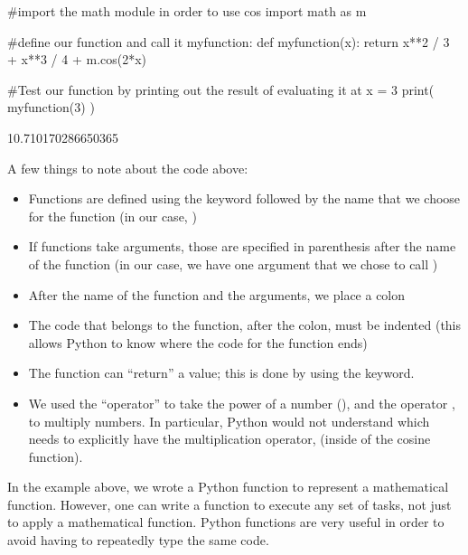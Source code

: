 \begin{python}[caption=Defining a function] 
#import the math module in order to use cos
import math as m

#define our function and call it myfunction:
def myfunction(x):
  return x**2 / 3 + x**3 / 4 + m.cos(2*x)
  
#Test our function by printing out the result of evaluating it at x = 3
print( myfunction(3) )  
\end{python}
\begin{poutput}
10.710170286650365
\end{poutput}
A few things to note about the code above:
\begin{itemize}
\item Functions are defined using the  keyword followed by the name that we choose for the function (in our case, )
\item If functions take arguments, those are specified in parenthesis after the name of the function (in our case, we have one argument that we chose to call )
\item After the name of the function and the arguments, we place a colon
\item The code that belongs to the function, after the colon, must be indented (this allows Python to know where the code for the function ends)
\item The function can ``return'' a value; this is done by using the  keyword. 
\item We used the ``operator'' \code{**} to take the power of a number (), and the operator \code{*}, to multiply numbers. In particular, Python would not understand  which needs to explicitly have the multiplication operator,  (inside of the cosine function).
\end{itemize}
In the example above, we wrote a Python function to represent a mathematical function. However, one can write a function to execute any set of tasks, not just to apply a mathematical function. Python functions are very useful in order to avoid having to repeatedly type the same code. 

